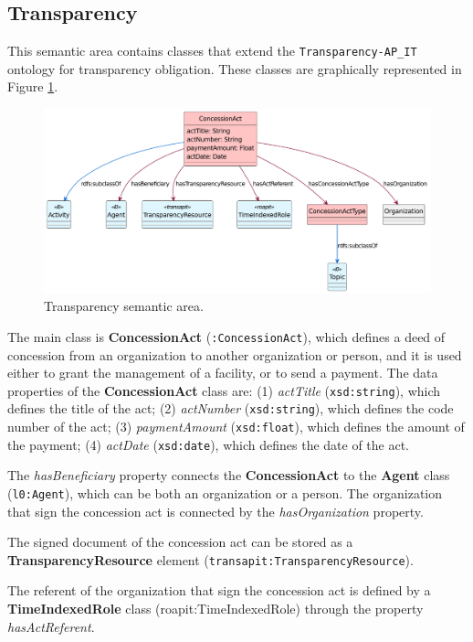 \subsection{Transparency}
\label{subsec:transparency}

This semantic area contains classes that extend the \verb#Transparency-AP_IT# ontology for transparency obligation. These classes are graphically represented in Figure \ref{fig:transparency-sa}.

\begin{figure}[!ht]
  \centering
  \includegraphics[width=\columnwidth]{images/ontoim/transparency}
  \caption{Transparency semantic area.}
  \label{fig:transparency-sa}
\end{figure}

The main class is \textbf{ConcessionAct} (\verb#:ConcessionAct#), which defines a deed of concession from an organization to another organization or person, and it is used either to grant the management of a facility, or to send a payment. The data properties of the \textbf{ConcessionAct} class are: (1) \textit{actTitle} (\verb#xsd:string#), which defines the title of the act; (2) \textit{actNumber} (\verb#xsd:string#), which defines the code number of the act; (3) \textit{paymentAmount} (\verb#xsd:float#), which defines the amount of the payment; (4) \textit{actDate} (\verb#xsd:date#), which defines the date of the act.

The \textit{hasBeneficiary} property connects the \textbf{ConcessionAct} to the \textbf{Agent} class (\verb#l0:Agent#), which can be both an organization or a person. The organization that sign the concession act is connected by the \textit{hasOrganization} property.

The signed document of the concession act can be stored as a \textbf{TransparencyResource} element (\verb#transapit:TransparencyResource#). 

The referent of the organization that sign the concession act is defined by a \textbf{TimeIndexedRole} class (roapit:TimeIndexedRole) through the property \textit{hasActReferent}.

